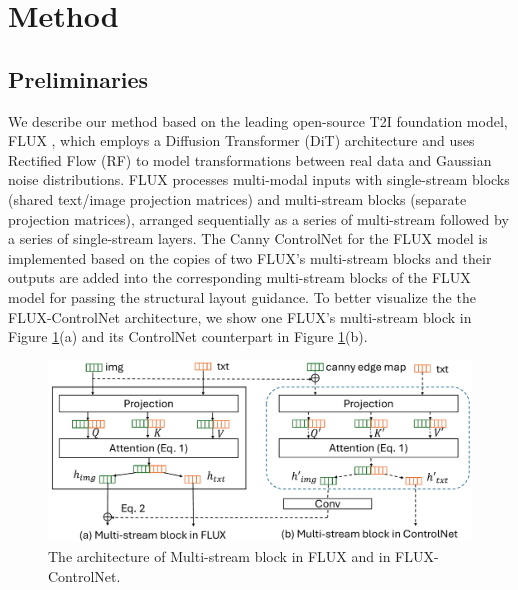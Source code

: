 \documentclass{article}
\begin{document}
\section{Method}
\subsection{Preliminaries}



We describe our method based on the leading open-source T2I foundation model, FLUX \citep{blackforest2024FLUX},  which employs a Diffusion Transformer (DiT) architecture  \citep{peebles2023scalable} and uses Rectified Flow (RF) \citep{liu2022flow} to model transformations between real data and Gaussian noise distributions. FLUX processes multi-modal inputs with single-stream blocks (shared text/image projection matrices) and multi-stream blocks (separate projection matrices), arranged sequentially as a series of  multi-stream followed by a series of single-stream layers. The Canny ControlNet \citep{xlabsai2025fluxcontrolnet} for the FLUX model is implemented based on the copies of two FLUX's multi-stream blocks and their outputs are added into the corresponding multi-stream blocks of the FLUX model for passing the structural layout guidance. To better visualize the the FLUX-ControlNet architecture, we show one FLUX's multi-stream block in Figure \ref{fig:FLUX_controlnet}(a) and its ControlNet counterpart in Figure \ref{fig:FLUX_controlnet}(b).


\begin{figure}[h!]
    \centering
    \includegraphics[width=0.7\linewidth]{figures/FLUX-double-controlnet.pdf}
    \caption{The architecture of Multi-stream block in FLUX and in FLUX-ControlNet.}
    \label{fig:FLUX_controlnet}
\end{figure}

\end{document}
